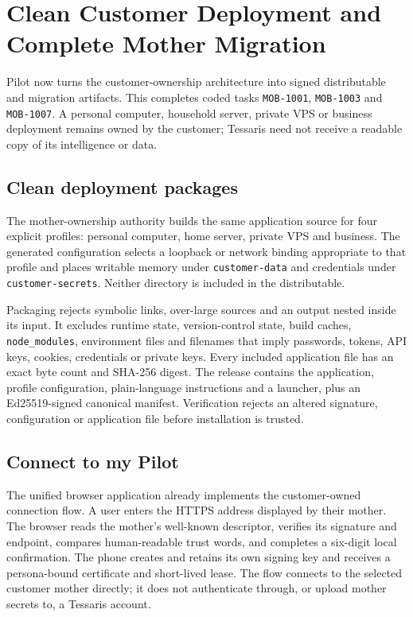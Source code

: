\section{Clean Customer Deployment and Complete Mother Migration}
\label{sec:pilot-customer-deployment-migration}

Pilot now turns the customer-ownership architecture into signed distributable and
migration artifacts.  This completes coded tasks \texttt{MOB-1001},
\texttt{MOB-1003} and \texttt{MOB-1007}.  A personal computer, household server,
private VPS or business deployment remains owned by the customer; Tessaris need not
receive a readable copy of its intelligence or data.

\subsection{Clean deployment packages}

The mother-ownership authority builds the same application source for four explicit
profiles: personal computer, home server, private VPS and business.  The generated
configuration selects a loopback or network binding appropriate to that profile and
places writable memory under \texttt{customer-data} and credentials under
\texttt{customer-secrets}.  Neither directory is included in the distributable.

Packaging rejects symbolic links, over-large sources and an output nested inside its
input.  It excludes runtime state, version-control state, build caches,
\texttt{node\_modules}, environment files and filenames that imply passwords, tokens,
API keys, cookies, credentials or private keys.  Every included application file has
an exact byte count and SHA-256 digest.  The release contains the application,
profile configuration, plain-language instructions and a launcher, plus an
Ed25519-signed canonical manifest.  Verification rejects an altered signature,
configuration or application file before installation is trusted.

\subsection{Connect to my Pilot}

The unified browser application already implements the customer-owned connection
flow.  A user enters the HTTPS address displayed by their mother.  The browser reads
the mother's well-known descriptor, verifies its signature and endpoint, compares
human-readable trust words, and completes a six-digit local confirmation.  The phone
creates and retains its own signing key and receives a persona-bound certificate and
short-lived lease.  The flow connects to the selected customer mother directly; it
does not authenticate through, or upload mother secrets to, a Tessaris account.

